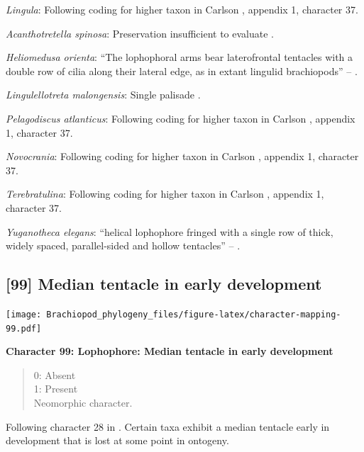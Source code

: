 \documentclass[openany]{book}
\theoremstyle{definition}
\theoremstyle{definition}
\theoremstyle{definition}
\theoremstyle{remark}
\begin{document}
\emph{Lingula}: Following coding for higher taxon in Carlson
\citeyearpar{Carlson1995Phylogeneticrelationships}, appendix 1,
character 37.

\emph{Acanthotretella spinosa}: Preservation insufficient to evaluate
\citep{Holmer2006Aspinose}.

\emph{Heliomedusa orienta}: ``The lophophoral arms bear laterofrontal
tentacles with a double row of cilia along their lateral edge, as in
extant lingulid brachiopods'' -- \citet{Zhang2009Architectureand}.

\emph{Lingulellotreta malongensis}: Single palisade
\citep{Zhang2004Newdata}.

\emph{Pelagodiscus atlanticus}: Following coding for higher taxon in
Carlson \citeyearpar{Carlson1995Phylogeneticrelationships}, appendix 1,
character 37.

\emph{Novocrania}: Following coding for higher taxon in Carlson
\citeyearpar{Carlson1995Phylogeneticrelationships}, appendix 1,
character 37.

\emph{Terebratulina}: Following coding for higher taxon in Carlson
\citeyearpar{Carlson1995Phylogeneticrelationships}, appendix 1,
character 37.

\emph{Yuganotheca elegans}: ``helical lophophore fringed with a single
row of thick, widely spaced, parallel-sided and hollow tentacles'' --
\citet{Zhang2014Anearly}.

\hypertarget{median-tentacle-in-early-development}{%
\subsection*{{[}99{]} Median tentacle in early
development}\label{median-tentacle-in-early-development}}

\texttt{[image: Brachiopod\_phylogeny\_files/figure-latex/character-mapping-99.pdf]}

\textbf{Character 99: Lophophore: Median tentacle in early development}

\begin{quote}
0: Absent\\
1: Present\\
Neomorphic character.
\end{quote}

Following character 28 in \citet{Carlson1995Phylogeneticrelationships}.
Certain taxa exhibit a median tentacle early in development that is lost
at some point in ontogeny.
\end{document}
